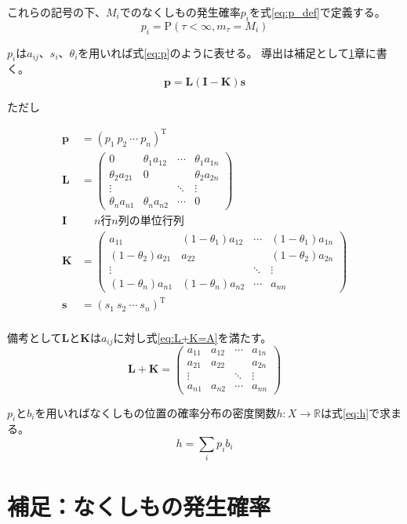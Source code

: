 \documentclass{jarticle}
\begin{document}
これらの記号の下、$M_i$でのなくしもの発生確率$p_i$を式\ref{eq:p_def}で定義する。
\begin{equation}
    \label{eq:p_def}
    p_i =\mathrm{P}(\tau < \infty , m_{\tau} = M_i)
\end{equation}

$p_i$は$a_{i j}$、$s_i$、$\theta_i$を用いれば式\ref{eq:p}のように表せる。
導出は補足として\ref{sec:calc_p}章に書く。
\begin{equation}
    \label{eq:p}
    \bm{p} =\bm{L}(\bm{I} - \bm{K})\bm{s}
\end{equation}
\begin{center}
    ただし
\end{center}
\begin{align*}
    \bm{p} &= (p_1\ p_2\ \cdots\ p_n)^\mathrm{T} \\
    \bm{L} &= \begin{pmatrix}
        0                & \theta_1 a_{1 2} & \cdots & \theta_1 a_{1 n} \\
        \theta_2 a_{2 1} & 0                &        & \theta_2 a_{2 n} \\
        \vdots           &                  & \ddots & \vdots           \\
        \theta_n a_{n 1} & \theta_n a_{n 2} & \cdots & 0
    \end{pmatrix} \\
    \bm{I} & \quad \ \text{$n$行$n$列の単位行列} \\
    \bm{K} &= \begin{pmatrix}
                       a_{1 1} & (1 - \theta_1) a_{1 2} & \cdots & (1 - \theta_1) a_{1 n} \\
        (1 - \theta_2) a_{2 1} &                a_{2 2} &        & (1 - \theta_2) a_{2 n} \\
        \vdots                 &                        & \ddots & \vdots                 \\
        (1 - \theta_n) a_{n 1} & (1 - \theta_n) a_{n 2} & \cdots &                a_{n n}
    \end{pmatrix} \\
    \bm{s} &= (s_1\ s_2\ \cdots\ s_n)^\mathrm{T} \\
\end{align*}

備考として$\bm{L}$と$\bm{K}$は$a_{i j}$に対し式\ref{eq:L+K=A}を満たす。
\begin{equation}
    \label{eq:L+K=A}
    \bm{L} + \bm{K} = \begin{pmatrix}
        a_{1 1} & a_{1 2} & \cdots & a_{1 n} \\
        a_{2 1} & a_{2 2} &        & a_{2 n} \\
        \vdots  &         & \ddots & \vdots  \\
        a_{n 1} & a_{n 2} & \cdots & a_{n n}
    \end{pmatrix}
\end{equation}

$p_i$と$b_i$を用いればなくしもの位置の確率分布の密度関数$h:X \rightarrow \mathbb{R}$は式\ref{eq:h}で求まる。
\begin{equation}
    \label{eq:h}
    h = \sum_{i}{p_i}b_i
\end{equation}





\section{補足：なくしもの発生確率}
\label{sec:calc_p}
\end{document}
